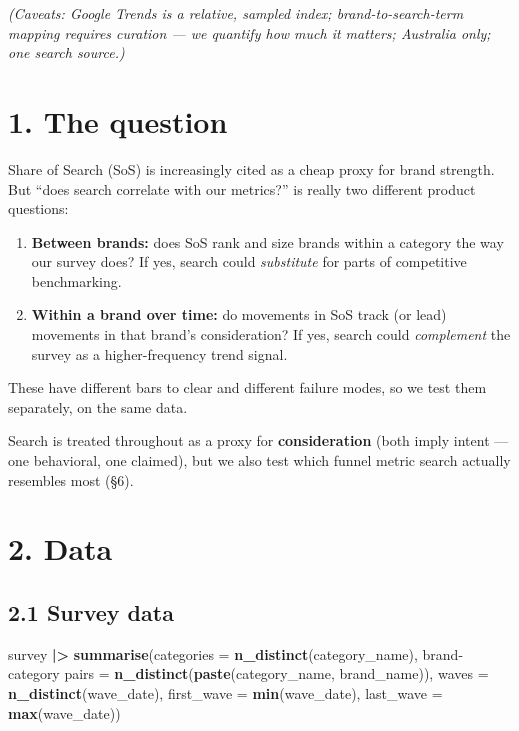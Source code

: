 \documentclass[
]{article}
\newenvironment{Shaded}{\begin{snugshade}}{\end{snugshade}}
\newcommand{\AttributeTok}[1]{\textcolor[rgb]{0.13,0.29,0.53}{#1}}
\newcommand{\FunctionTok}[1]{\textcolor[rgb]{0.13,0.29,0.53}{\textbf{#1}}}
\newcommand{\NormalTok}[1]{#1}
\newcommand{\OtherTok}[1]{\textcolor[rgb]{0.56,0.35,0.01}{#1}}
\newcommand{\SpecialCharTok}[1]{\textcolor[rgb]{0.81,0.36,0.00}{\textbf{#1}}}
\newcommand{\StringTok}[1]{\textcolor[rgb]{0.31,0.60,0.02}{#1}}
\providecommand{\tightlist}{%
  \setlength{\itemsep}{0pt}\setlength{\parskip}{0pt}}
\begin{document}
\emph{(Caveats: Google Trends is a relative, sampled index;
brand-to-search-term mapping requires curation --- we quantify how much
it matters; Australia only; one search source.)}

\hypertarget{the-question}{%
\section{1. The question}\label{the-question}}

Share of Search (SoS) is increasingly cited as a cheap proxy for brand
strength. But ``does search correlate with our metrics?'' is really two
different product questions:

\begin{enumerate}
\def\labelenumi{\arabic{enumi}.}
\tightlist
\item
  \textbf{Between brands:} does SoS rank and size brands within a
  category the way our survey does? If yes, search could
  \emph{substitute} for parts of competitive benchmarking.
\item
  \textbf{Within a brand over time:} do movements in SoS track (or lead)
  movements in that brand's consideration? If yes, search could
  \emph{complement} the survey as a higher-frequency trend signal.
\end{enumerate}

These have different bars to clear and different failure modes, so we
test them separately, on the same data.

Search is treated throughout as a proxy for \textbf{consideration} (both
imply intent --- one behavioral, one claimed), but we also test which
funnel metric search actually resembles most (§6).

\hypertarget{data}{%
\section{2. Data}\label{data}}

\hypertarget{survey-data}{%
\subsection{2.1 Survey data}\label{survey-data}}

\begin{Shaded}
\begin{Highlighting}[]
\NormalTok{survey }\SpecialCharTok{|\textgreater{}}
  \FunctionTok{summarise}\NormalTok{(}\AttributeTok{categories =} \FunctionTok{n\_distinct}\NormalTok{(category\_name),}
            \StringTok{\textasciigrave{}}\AttributeTok{brand{-}category pairs}\StringTok{\textasciigrave{}} \OtherTok{=} \FunctionTok{n\_distinct}\NormalTok{(}\FunctionTok{paste}\NormalTok{(category\_name, brand\_name)),}
            \AttributeTok{waves =} \FunctionTok{n\_distinct}\NormalTok{(wave\_date),}
            \AttributeTok{first\_wave =} \FunctionTok{min}\NormalTok{(wave\_date), }\AttributeTok{last\_wave =} \FunctionTok{max}\NormalTok{(wave\_date))}
\end{Highlighting}
\end{Shaded}
\end{document}
